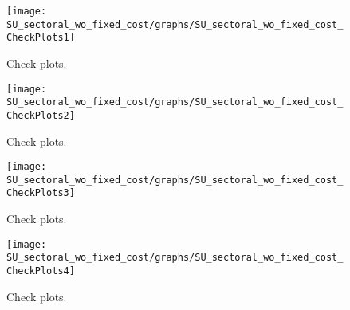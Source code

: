  
\begin{figure}[H]
\centering 
\texttt{[image: SU\_sectoral\_wo\_fixed\_cost/graphs/SU\_sectoral\_wo\_fixed\_cost\_CheckPlots1]}
\caption{Check plots.}\label{Fig:CheckPlots:1}
\end{figure}
 
\begin{figure}[H]
\centering 
\texttt{[image: SU\_sectoral\_wo\_fixed\_cost/graphs/SU\_sectoral\_wo\_fixed\_cost\_CheckPlots2]}
\caption{Check plots.}\label{Fig:CheckPlots:2}
\end{figure}
 
\begin{figure}[H]
\centering 
\texttt{[image: SU\_sectoral\_wo\_fixed\_cost/graphs/SU\_sectoral\_wo\_fixed\_cost\_CheckPlots3]}
\caption{Check plots.}\label{Fig:CheckPlots:3}
\end{figure}
 
\begin{figure}[H]
\centering 
\texttt{[image: SU\_sectoral\_wo\_fixed\_cost/graphs/SU\_sectoral\_wo\_fixed\_cost\_CheckPlots4]}
\caption{Check plots.}\label{Fig:CheckPlots:4}
\end{figure}
 
